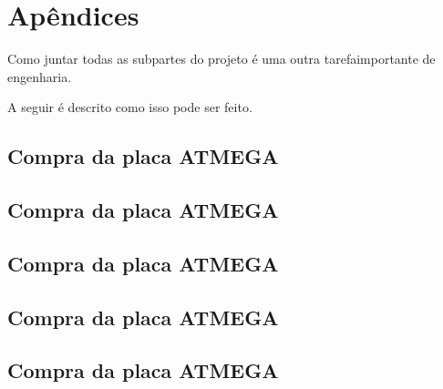 \chapter{Apêndices}\label{CAP:integracao}

\label{CAP8}

Como juntar todas as subpartes do projeto é uma outra tarefaimportante de engenharia.

A seguir é descrito como isso pode ser feito.

\section{Compra da placa ATMEGA}
\section{Compra da placa ATMEGA}
\section{Compra da placa ATMEGA}
\section{Compra da placa ATMEGA}
\section{Compra da placa ATMEGA}